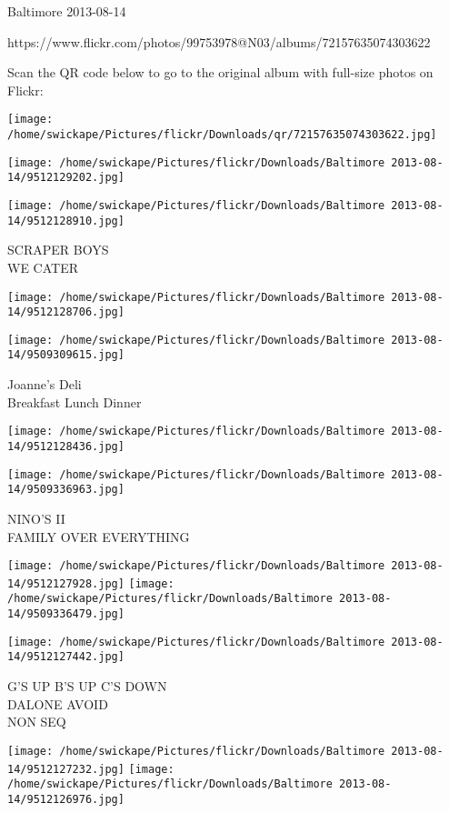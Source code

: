 \documentclass[10pt,letterpaper]{article}
\begin{document}
Baltimore 2013-08-14

https://www.flickr.com/photos/99753978@N03/albums/72157635074303622

Scan the QR code below to go to the original album with full-size photos on Flickr:

\texttt{[image: /home/swickape/Pictures/flickr/Downloads/qr/72157635074303622.jpg]}
\pagebreak

\texttt{[image: /home/swickape/Pictures/flickr/Downloads/Baltimore 2013-08-14/9512129202.jpg]}

\vspace{0.25in}
\texttt{[image: /home/swickape/Pictures/flickr/Downloads/Baltimore 2013-08-14/9512128910.jpg]}

SCRAPER BOYS\\
WE CATER
\pagebreak

\texttt{[image: /home/swickape/Pictures/flickr/Downloads/Baltimore 2013-08-14/9512128706.jpg]}

\vspace{0.25in}
\texttt{[image: /home/swickape/Pictures/flickr/Downloads/Baltimore 2013-08-14/9509309615.jpg]}

Joanne's Deli\\
Breakfast Lunch Dinner
\pagebreak

\texttt{[image: /home/swickape/Pictures/flickr/Downloads/Baltimore 2013-08-14/9512128436.jpg]}

\vspace{0.25in}
\texttt{[image: /home/swickape/Pictures/flickr/Downloads/Baltimore 2013-08-14/9509336963.jpg]}

NINO'S II\\
FAMILY OVER EVERYTHING
\pagebreak

\texttt{[image: /home/swickape/Pictures/flickr/Downloads/Baltimore 2013-08-14/9512127928.jpg]}
\texttt{[image: /home/swickape/Pictures/flickr/Downloads/Baltimore 2013-08-14/9509336479.jpg]}

\vspace{0.25in}
\texttt{[image: /home/swickape/Pictures/flickr/Downloads/Baltimore 2013-08-14/9512127442.jpg]}

G'S UP B'S UP C'S DOWN\\
DALONE AVOID\\
NON SEQ
\pagebreak

\texttt{[image: /home/swickape/Pictures/flickr/Downloads/Baltimore 2013-08-14/9512127232.jpg]}
\texttt{[image: /home/swickape/Pictures/flickr/Downloads/Baltimore 2013-08-14/9512126976.jpg]}
\end{document}

